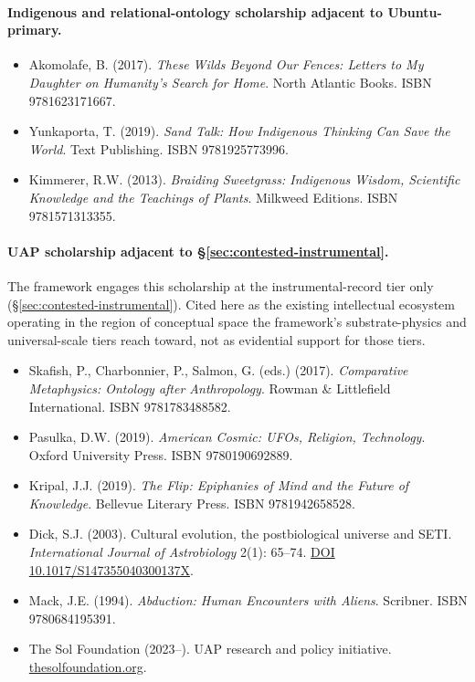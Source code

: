 \documentclass[11pt,a4paper]{article}
\begin{document}
\paragraph{Indigenous and relational-ontology scholarship adjacent to Ubuntu-primary.}
\begin{itemize}[leftmargin=*,itemsep=2pt]
\item Akomolafe, B. (2017). \emph{These Wilds Beyond Our Fences: Letters to My Daughter on Humanity's Search for Home}. North Atlantic Books. ISBN 9781623171667.
\item Yunkaporta, T. (2019). \emph{Sand Talk: How Indigenous Thinking Can Save the World}. Text Publishing. ISBN 9781925773996.
\item Kimmerer, R.W. (2013). \emph{Braiding Sweetgrass: Indigenous Wisdom, Scientific Knowledge and the Teachings of Plants}. Milkweed Editions. ISBN 9781571313355.
\end{itemize}

\paragraph{UAP scholarship adjacent to \S\ref{sec:contested-instrumental}.} The framework engages this scholarship at the instrumental-record tier only (\S\ref{sec:contested-instrumental}). Cited here as the existing intellectual ecosystem operating in the region of conceptual space the framework's substrate-physics and universal-scale tiers reach toward, not as evidential support for those tiers.
\begin{itemize}[leftmargin=*,itemsep=2pt]
\item Skafish, P., Charbonnier, P., Salmon, G. (eds.) (2017). \emph{Comparative Metaphysics: Ontology after Anthropology}. Rowman \& Littlefield International. ISBN 9781783488582.
\item Pasulka, D.W. (2019). \emph{American Cosmic: UFOs, Religion, Technology}. Oxford University Press. ISBN 9780190692889.
\item Kripal, J.J. (2019). \emph{The Flip: Epiphanies of Mind and the Future of Knowledge}. Bellevue Literary Press. ISBN 9781942658528.
\item Dick, S.J. (2003). Cultural evolution, the postbiological universe and SETI. \emph{International Journal of Astrobiology} 2(1): 65--74. \href{https://doi.org/10.1017/S147355040300137X}{DOI 10.1017/S147355040300137X}.
\item Mack, J.E. (1994). \emph{Abduction: Human Encounters with Aliens}. Scribner. ISBN 9780684195391.
\item The Sol Foundation (2023--). UAP research and policy initiative. \href{https://thesolfoundation.org}{thesolfoundation.org}.
\end{itemize}
\end{document}

